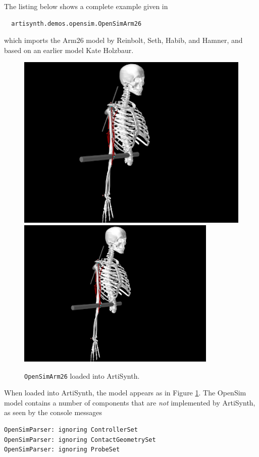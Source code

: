 The listing below shows a complete example given in
\begin{verbatim}
  artisynth.demos.opensim.OpenSimArm26
\end{verbatim}
which imports the Arm26 model by Reinbolt, Seth, Habib, and Hamner, and based
on an earlier model Kate Holzbaur.
%
\lstset{numbers=left}

\lstset{numbers=none}
%
\begin{figure}[ht]
\begin{center}
   \iflatexml 
      \includegraphics[]{images/OpenSimArm26} 
   \else 
      \includegraphics[width=3.75in]{images/OpenSimArm26} \fi
\end{center}
\caption{{\tt OpenSimArm26} loaded into ArtiSynth.}
\label{OpenSimArm26:fig}
\end{figure}
%
When loaded into ArtiSynth, the model appears as in Figure
\ref{OpenSimArm26:fig}. The OpenSim model contains a number of components that are {\it not} implemented
by ArtiSynth, as seen by the console messages
\begin{verbatim}
OpenSimParser: ignoring ControllerSet
OpenSimParser: ignoring ContactGeometrySet
OpenSimParser: ignoring ProbeSet
\end{verbatim}

